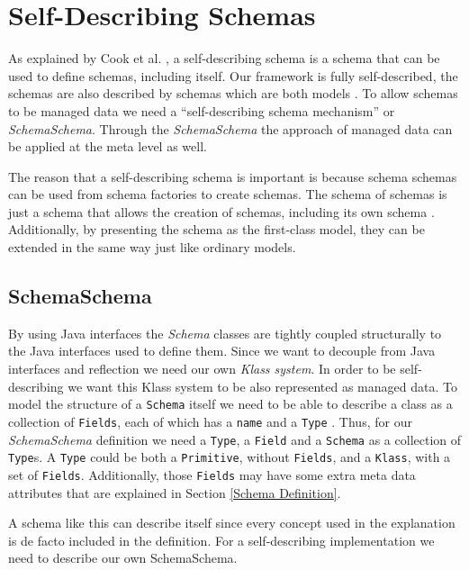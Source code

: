 \section{Self-Describing Schemas}\label{Self-Describing Schemas}
As explained by Cook et al. \cite{loh2012managed}, a self-describing schema is a schema that can be used to define schemas, including itself.
Our framework is fully self-described, the schemas are also described by schemas which are both models \cite{kurtev2006model}. 
To allow schemas to be managed data we need a ``self-describing schema mechanism'' or \textit{SchemaSchema}.
Through the \textit{SchemaSchema} the approach of managed data can be applied at the meta level as well.

The reason that a self-describing schema is important is because schema schemas can be used from schema factories to create schemas.
The schema of schemas is just a schema that allows the creation of schemas, including its own schema \cite{storm2012object}.
Additionally, by presenting the schema as the first-class model\cite{kurtev2006model}, they can be extended in the same way just like ordinary models.

\subsection{SchemaSchema}\label{sec:SchemaSchema}
By using Java interfaces the \textit{Schema} classes are tightly coupled structurally to the Java interfaces used to define them.
Since we want to decouple from Java interfaces and reflection we need our own \textit{Klass system}.
In order to be self-describing we want this Klass system to be also represented as managed data. 
To model the structure of a \texttt{Schema} itself we need to be able to describe a class as a collection of \texttt{Fields}, each of which has a \texttt{name} and a \texttt{Type} \cite{loh2012managed}. 
Thus, for our \textit{SchemaSchema} definition we need a \texttt{Type}, a \texttt{Field} and a \texttt{Schema} as a collection of \texttt{Type}s. 
A \texttt{Type} could be both a \texttt{Primitive}, without \texttt{Fields}, and a \texttt{Klass}, with a set of \texttt{Fields}.
Additionally, those \texttt{Fields} may have some extra meta data attributes that are explained in Section \ref{Schema Definition}.

A schema like this can describe itself since every concept used in the explanation is de facto included in the definition.
For a self-describing implementation we need to describe our own SchemaSchema. 

